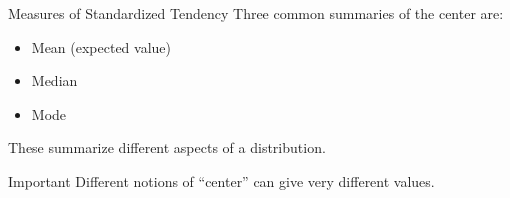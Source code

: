\begin{frame}{Measures of Standardized Tendency}
Three common summaries of the center are:

\begin{itemize}
    \item Mean (expected value)

    \item Median

    \item Mode
\end{itemize}

\vspace{0.25cm}

These summarize different aspects of a distribution.

\vspace{0.25cm}

\begin{keybox}{Important}
Different notions of “center” can give very different values.
\end{keybox}
\end{frame}

